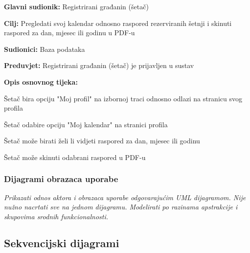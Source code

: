 	\noindent {}
	\begin{packed_item}
		
		\item \textbf{Glavni sudionik:} Registrirani građanin (šetač)
		\item  \textbf{Cilj:} Pregledati svoj kalendar odnosno raspored rezerviranih šetnji i skinuti raspored za dan, mjesec ili godinu u PDF-u
		\item  \textbf{Sudionici:} Baza podataka
		\item  \textbf{Preduvjet:} Registrirani građanin (šetač) je prijavljen u sustav
		\item  \textbf{Opis osnovnog tijeka:}
		
		\item[] \begin{packed_enum}
			\item Šetač bira opciju "Moj profil" na izbornoj traci odnosno odlazi na stranicu svog profila
			\item Šetač odabire opciju "Moj kalendar" na stranici profila
			\item Šetač može birati želi li vidjeti raspored za dan, mjesec ili godinu
			\item Šetač može skinuti odabrani raspored u PDF-u
		\end{packed_enum}
	\end{packed_item}
		
		
		
		
		
		
		
		
			
			
	
                                                                 
			
				
			\subsubsection{Dijagrami obrazaca uporabe}
				
				\textit{Prikazati odnos aktora i obrazaca uporabe odgovarajućim UML dijagramom. Nije nužno nacrtati sve na jednom dijagramu. Modelirati po razinama apstrakcije i skupovima srodnih funkcionalnosti.}
			\eject		
			
		\subsection{Sekvencijski dijagrami}
			

